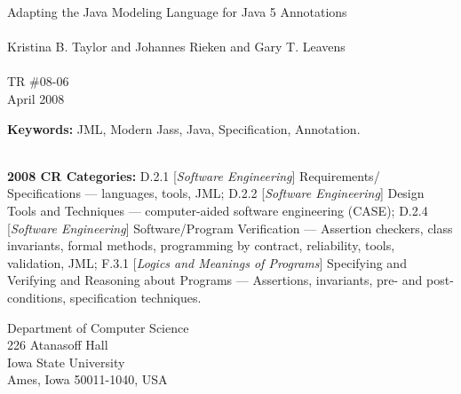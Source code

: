 \thispagestyle{empty}
\begin{titlepage}
\vspace*{0.6in}
\begin{center}
{\LARGE Adapting the Java Modeling Language for Java 5 Annotations} \\
~ \\
Kristina B. Taylor and Johannes Rieken and Gary T. Leavens \\
 ~ \\
TR \#08-06 \\
April 2008
\end{center}


\thispagestyle{empty}

\vfill

\noindent
{\bf Keywords:}
JML, Modern Jass, Java, Specification, Annotation.

~ \\
{\bf 2008 CR Categories:}
D.2.1 [{\em Software Engineering\/}]
        Requirements/ Specifications --- languages, tools, JML;
D.2.2 [{\em Software Engineering\/}]
        Design Tools and Techniques --- 
                computer-aided software engineering (CASE);
D.2.4 [{\em Software Engineering\/}]
        Software/Program Verification --- Assertion checkers,
                class invariants, formal methods, programming by contract,
                reliability, tools, validation, JML;
F.3.1 [{\em Logics and Meanings of Programs\/}]
        Specifying and Verifying and Reasoning about Programs ---
                Assertions, invariants, pre- and post-conditions,
                specification techniques.

\vspace*{0.2in}


\vspace*{0.4in}

\begin{center}
Department of Computer Science \\
226 Atanasoff Hall \\
Iowa State University \\
Ames, Iowa 50011-1040, USA
\end{center}
\end{titlepage}
\thispagestyle{empty}
